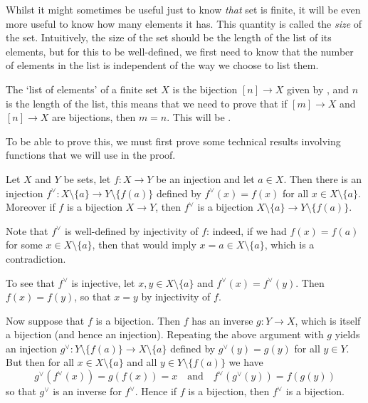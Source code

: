 Whilst it might sometimes be useful just to know \textit{that} set is finite, it will be even more useful to know how many elements it has. This quantity is called the \textit{size} of the set. Intuitively, the size of the set should be the length of the list of its elements, but for this to be well-defined, we first need to know that the number of elements in the list is independent of the way we choose to list them.

The `list of elements' of a finite set $X$ is the bijection $[n] \to X$ given by , and $n$ is the length of the list, this means that we need to prove that if $[m] \to X$ and $[n] \to X$ are bijections, then $m=n$. This will be .

To be able to prove this, we must first prove some technical results involving functions that we will use in the proof.

\begin{lemma}
\label{lemRemoveElementFromDomainAndCodomain}
Let $X$ and $Y$ be sets, let $f : X \to Y$ be an injection and let $a \in X$. Then there is an injection $f^{\vee} : X \setminus \{ a \} \to Y \setminus \{ f(a) \}$ defined by $f^{\vee}(x) = f(x)$ for all $x \in X \setminus \{ a \}$. Moreover if $f$ is a bijection $X \to Y$, then $f^{\vee}$ is a bijection $X \setminus \{ a \} \to Y \setminus \{ f(a) \}$.
\end{lemma}

\begin{cproof}
Note that $f^{\vee}$ is well-defined by injectivity of $f$: indeed, if we had $f(x) = f(a)$ for some $x \in X \setminus \{ a \}$, then that would imply $x=a \in X \setminus \{ a \}$, which is a contradiction.

To see that $f^{\vee}$ is injective, let $x,y \in X \setminus \{ a \}$ and $f^{\vee}(x) = f^{\vee}(y)$. Then $f(x) = f(y)$, so that $x=y$ by injectivity of $f$.

Now suppose that $f$ is a bijection. Then $f$ has an inverse $g : Y \to X$, which is itself a bijection (and hence an injection). Repeating the above argument with $g$ yields an injection $g^{\vee} : Y \setminus \{ f(a) \} \to X \setminus \{ a \}$ defined by $g^{\vee}(y) = g(y)$ for all $y \in Y$. But then for all $x \in X \setminus \{ a \}$ and all $y \in Y \setminus \{ f(a) \}$ we have
\[ g^{\vee}(f^{\vee}(x)) = g(f(x)) = x \quad \text{and} \quad f^{\vee}(g^{\vee}(y)) = f(g(y)) \]
so that $g^{\vee}$ is an inverse for $f^{\vee}$. Hence if $f$ is a bijection, then $f^{\vee}$ is a bijection.
\end{cproof}


